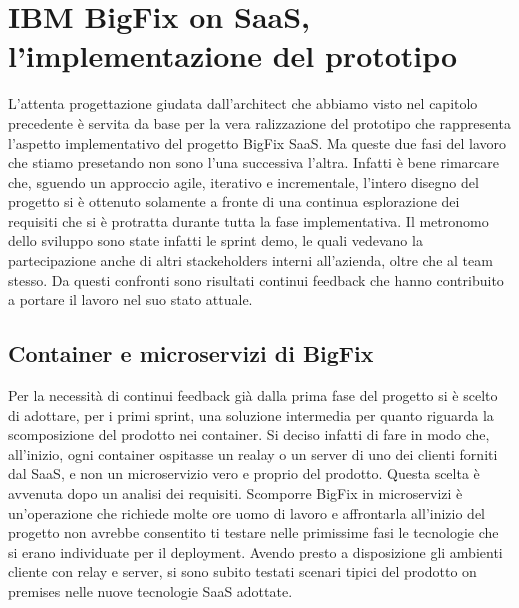 \chapter{IBM BigFix on SaaS, l'implementazione del prototipo}
L'attenta progettazione giudata dall'architect che abbiamo visto nel capitolo precedente è servita da base per la vera ralizzazione del prototipo che rappresenta l'aspetto implementativo del progetto BigFix SaaS. Ma queste due fasi del lavoro che stiamo presetando non sono l'una successiva l'altra. Infatti è bene rimarcare che, sguendo un approccio agile, iterativo e incrementale, l'intero disegno del progetto si è ottenuto solamente a fronte di una continua esplorazione dei requisiti che si è protratta durante tutta la fase implementativa. Il metronomo dello sviluppo sono state infatti le sprint demo, le quali vedevano la partecipazione anche di altri stackeholders interni all'azienda, oltre che al team stesso. Da questi confronti sono risultati continui feedback che hanno contribuito a portare il lavoro nel suo stato attuale.

\section{Container e microservizi di BigFix}
Per la necessità di continui feedback già dalla prima fase del progetto si è scelto di adottare, per i primi sprint, una soluzione intermedia per quanto riguarda la scomposizione del prodotto nei container. Si deciso infatti di fare in modo che, all'inizio, ogni container ospitasse un realay o un server di uno dei clienti forniti dal SaaS, e non un microservizio vero e proprio del prodotto. Questa scelta è avvenuta dopo un analisi dei requisiti. Scomporre BigFix in microservizi è un'operazione che richiede molte ore uomo di lavoro e affrontarla all'inizio del progetto non avrebbe consentito ti testare nelle primissime fasi le tecnologie che si erano individuate per il deployment. Avendo presto a disposizione gli ambienti cliente con relay e server, si sono subito testati scenari tipici del prodotto on premises nelle nuove tecnologie SaaS adottate.

